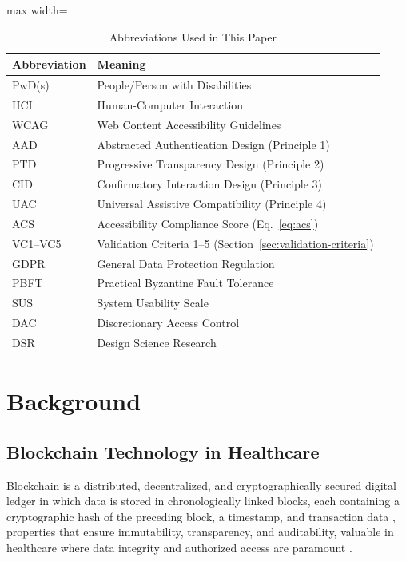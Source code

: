 \documentclass[journal,onecolumn]{IEEEtran}
\begin{document}
\begin{table}[htbp]
\caption{Abbreviations Used in This Paper}
\label{tab:abbreviations}
\begin{center}
\small
\begin{adjustbox}{max width=\columnwidth}
\begin{tabular}{|l|l|}
\hline
\textbf{Abbreviation} & \textbf{Meaning} \\
\hline
PwD(s) & People/Person with Disabilities \\
\hline
HCI & Human-Computer Interaction \\
\hline
WCAG & Web Content Accessibility Guidelines \\
\hline
AAD & Abstracted Authentication Design (Principle 1) \\
\hline
PTD & Progressive Transparency Design (Principle 2) \\
\hline
CID & Confirmatory Interaction Design (Principle 3) \\
\hline
UAC & Universal Assistive Compatibility (Principle 4) \\
\hline
ACS & Accessibility Compliance Score (Eq.~\ref{eq:acs}) \\
\hline
VC1--VC5 & Validation Criteria 1--5 (Section~\ref{sec:validation-criteria}) \\
\hline
GDPR & General Data Protection Regulation \\
\hline
PBFT & Practical Byzantine Fault Tolerance \\
\hline
SUS & System Usability Scale \\
\hline
DAC & Discretionary Access Control \\
\hline
DSR & Design Science Research \\
\hline
\end{tabular}
\end{adjustbox}
\end{center}
\end{table}

\section{Background}
\label{sec:background}

\subsection{Blockchain Technology in Healthcare}
Blockchain is a distributed, decentralized, and cryptographically secured digital ledger in which data is stored in chronologically linked blocks, each containing a cryptographic hash of the preceding block, a timestamp, and transaction data \cite{taherdoost2023role}, properties that ensure immutability, transparency, and auditability, valuable in healthcare where data integrity and authorized access are paramount \cite{ehsan2022integrating}.
\end{document}
